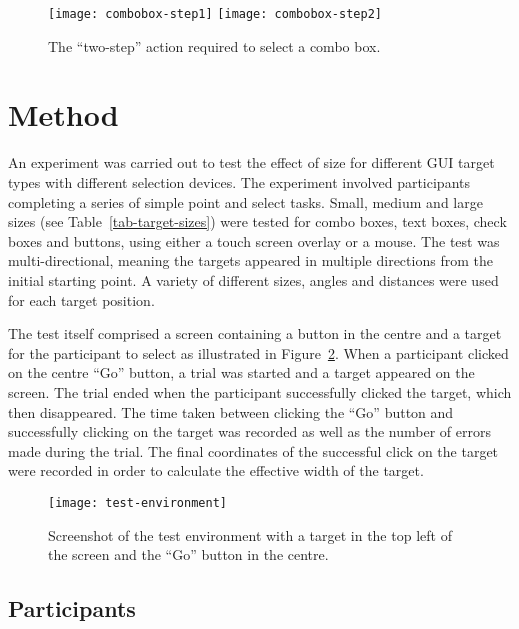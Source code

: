 \documentclass{elsart}
\begin{document}
\begin{figure}[ht]
	\centering
	\texttt{[image: combobox-step1]}\quad\quad\quad
	\texttt{[image: combobox-step2]}
	\caption{The ``two-step'' action required to select a combo box.}
	\label{fig-combo-box}
\end{figure}



\section{Method}
\label{sec-method}

An experiment was carried out to test the effect of size for different
GUI target types with different selection devices. The experiment
involved participants completing a series of simple point and select
tasks. Small, medium and large sizes (see Table~\ref{tab-target-sizes})
were tested for combo boxes, text boxes, check boxes and buttons, using
either a touch screen overlay or a mouse. The test was
multi-directional, meaning the targets appeared in multiple directions
from the initial starting point. A variety of different sizes, angles
and distances were used for each target position.

The test itself comprised a screen containing a button in the centre and
a target for the participant to select as illustrated in
Figure~\ref{fig-test-environment}. When a participant clicked on the
centre ``Go'' button, a trial was started and a target appeared on the
screen. The trial ended when the participant successfully clicked the
target, which then disappeared. The time taken between clicking the
``Go'' button and successfully clicking on the target was recorded as
well as the number of errors made during the trial. The final
coordinates of the successful click on the target were recorded in order
to calculate the effective width of the target.


\begin{figure}
	\centering
 	\texttt{[image: test-environment]}
	\caption{Screenshot of the test environment with a target in the
	top left of the screen and the ``Go'' button in the centre.}
	\label{fig-test-environment}
\end{figure}


\subsection{Participants}
\label{sec-method-participants}
\end{document}
